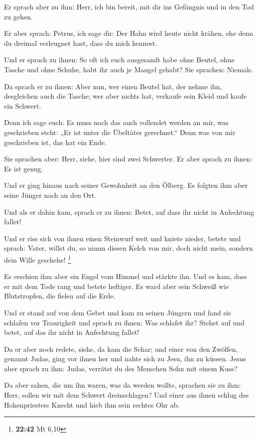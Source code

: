  Er sprach aber zu ihm: Herr, ich bin bereit, mit dir ins
Gefängnis und in den Tod zu gehen.

 Er aber sprach: Petrus, ich sage dir: Der Hahn wird
heute nicht krähen, ehe denn du dreimal verleugnet hast, dass du mich
kennest.

 Und er sprach zu ihnen: So oft ich euch ausgesandt habe
ohne Beutel, ohne Tasche und ohne Schuhe, habt ihr auch je Mangel
gehabt? Sie sprachen: Niemals.

 Da sprach er zu ihnen: Aber nun, wer einen Beutel hat,
der nehme ihn, desgleichen auch die Tasche; wer aber nichts hat,
verkaufe sein Kleid und kaufe ein Schwert.

 Denn ich sage euch: Es muss noch das auch vollendet
werden an mir, was geschrieben steht: „Er ist unter die Übeltäter
gerechnet.`` Denn was von mir geschrieben ist, das hat ein Ende.

 Sie sprachen aber: Herr, siehe, hier sind zwei
Schwerter. Er aber sprach zu ihnen: Es ist genug.

 Und er ging hinaus nach seiner Gewohnheit an den Ölberg.
Es folgten ihm aber seine Jünger nach an den Ort.

 Und als er dahin kam, sprach er zu ihnen: Betet, auf
dass ihr nicht in Anfechtung fallet!

 Und er riss sich von ihnen einen Steinwurf weit und
kniete nieder, betete  und sprach: Vater, willst du, so
nimm diesen Kelch von mir, doch nicht mein, sondern dein Wille geschehe!
\footnote{\textbf{22:42} Mt 6,10}

 Es erschien ihm aber ein Engel vom Himmel und stärkte
ihn.  Und es kam, dass er mit dem Tode rang und betete
heftiger. Es ward aber sein Schweiß wie Blutstropfen, die fielen auf die
Erde.

 Und er stand auf von dem Gebet und kam zu seinen Jüngern
und fand sie schlafen vor Traurigkeit  und sprach zu
ihnen: Was schlafet ihr? Stehet auf und betet, auf das ihr nicht in
Anfechtung fallet!

 Da er aber noch redete, siehe, da kam die Schar; und
einer von den Zwölfen, genannt Judas, ging vor ihnen her und nahte sich
zu Jesu, ihn zu küssen.  Jesus aber sprach zu ihm: Judas,
verrätst du des Menschen Sohn mit einem Kuss?

 Da aber sahen, die um ihn waren, was da werden wollte,
sprachen sie zu ihm: Herr, sollen wir mit dem Schwert dreinschlagen?
 Und einer aus ihnen schlug des Hohenpriesters Knecht und
hieb ihm sein rechtes Ohr ab.

